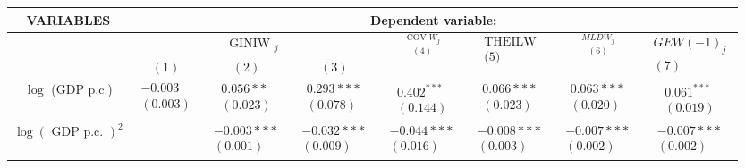 \documentclass[10pt]{article}
\begin{document}
\begin{center}
\begin{tabular}{|c|c|c|c|c|c|c|c|}
\hline
\multirow[b]{3}{*}{VARIABLES} & \multicolumn{7}{|c|}{Dependent variable:} \\
\hline
 & \multicolumn{3}{|c|}{GINIW $_{j}$} & \multirow{2}{*}{$\frac{\operatorname{COV} W_{j}}{(4)}$} & \multirow{2}{*}{$\begin{array}{l}\text { THEILW } \\
\text { (5) }\end{array}$} & \multirow{2}{*}{$\frac{M L D W_{j}}{(6)}$} & \multirow{2}{*}{$\begin{array}{l}G E W(-1)_{j} \\
(7)\end{array}$} \\
\hline
 & $(1)$ & $(2)$ & $(3)$ &  &  &  &  \\
\hline
$\log$ (GDP p.c.) & $\begin{array}{l}-0.003 \\ (0.003)\end{array}$ & $\begin{array}{l}0.056 * * \\ (0.023)\end{array}$ & $\begin{array}{l}0.293 * * * \\ (0.078)\end{array}$ & $\begin{array}{l}0.402^{* * *} \\ (0.144)\end{array}$ & $\begin{array}{l}0.066 * * * \\ (0.023)\end{array}$ & $\begin{array}{l}0.063 * * * \\ (0.020)\end{array}$ & $\begin{array}{l}0.061^{* * *} \\ (0.019)\end{array}$ \\
\hline
$\log (\text { GDP p.c. })^{2}$ &  & $\begin{array}{l}-0.003 * * * \\ (0.001)\end{array}$ & $\begin{array}{l}-0.032 * * * \\ (0.009)\end{array}$ & $\begin{array}{l}-0.044 * * * \\ (0.016)\end{array}$ & $\begin{array}{l}-0.008 * * * \\ (0.003)\end{array}$ & $\begin{array}{l}-0.007 * * * \\ (0.002)\end{array}$ & $\begin{array}{l}-0.007 * * * \\ (0.002)\end{array}$ \\

\end{tabular}
\end{center}
\end{document}
